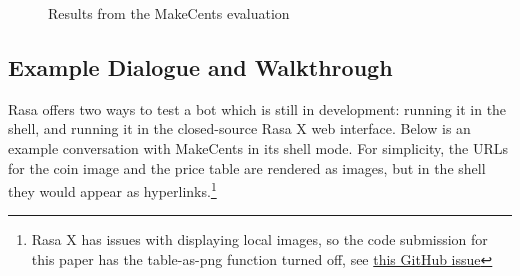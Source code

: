 \documentclass[11pt,a4paper]{article}
\begin{document}
\begin{figure}[t]
  \caption{Results from the MakeCents evaluation}
  \label{fig:results}
\end{figure}

\subsection{Example Dialogue and Walkthrough}\label{subsec:ex}

Rasa offers two ways to test a bot which is still in development: running it in the shell, and running it in the closed-source Rasa X web interface. Below is an example conversation with MakeCents in its shell mode. For simplicity, the URLs for the coin image and the price table are rendered as images, but in the shell they would appear as hyperlinks.\footnote{Rasa X has issues with displaying local images, so the code submission for this paper has the table-as-png function turned off, see \href{https://github.com/ryanamannion/makecents/issues/1}{this GitHub issue}}
\end{document}
